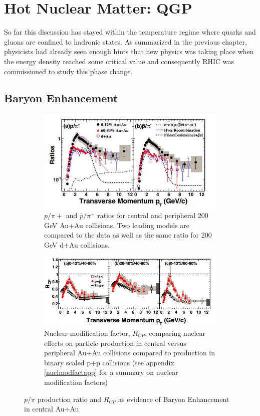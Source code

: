 \section{Hot Nuclear Matter: QGP}
So far this discussion has stayed within the temperature regime where quarks and gluons are confined to hadronic states. As summarized in the previous chapter, physicists had already seen enough hints that new physics was taking place when the energy density reached some critical value and consequently RHIC was commissioned to study this phase change.

\subsection{Baryon Enhancement}

\begin{figure}
\centering
\begin{subfigure}[b]{0.7\textwidth}
    \centering
    \includegraphics[width=\textwidth]{prevplots/ppiratiocentvsperiph.JPG}
    \caption{ $p/\pi{+}$ and $\bar{p}/\pi^{-}$ ratios for central and peripheral 200 GeV Au+Au collisions. Two leading models are compared to the data as well as the same ratio for 200 GeV d+Au collisions.}
    \label{fig:ppiratiocentvsperiph}
\end{subfigure}
\begin{subfigure}[b]{0.8\textwidth}
    \centering
    \includegraphics[width=\textwidth]{prevplots/Rcpcentvsperiph.jpg}
    \caption{Nuclear modification factor, $R_{CP}$, comparing nuclear effects on particle production in central versus peripheral Au+Au collisions compared to production in binary scaled p+p collisions (see appendix \ref{nuclmodfactapp} for a summary on nuclear modification factors)}
    \label{fig:Rcpcentvsperiph}
\end{subfigure}
\caption[Evidence of Baryon Enhancement in Au+Au collisions]{$p/\pi$ production ratio and $R_{CP}$ as evidence of Baryon Enhancement in central Au+Au}
\label{fig:baryonenhancementAA}
\end{figure}

